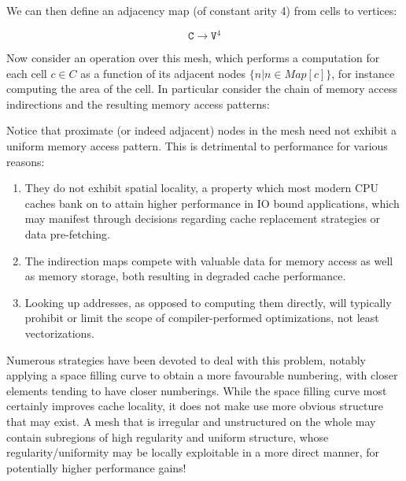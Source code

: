 We can then define an adjacency map (of constant arity 4) from cells to vertices:

$$\texttt{C} \rightarrow \texttt{V}^4$$

Now consider an operation over this mesh, which performs a computation for each cell $c \in C$ as a function of its adjacent nodes $\{n | n \in Map[c]\}$, for instance computing the area of the cell. In particular consider the chain of memory access indirections and the resulting memory access patterns:

%

Notice that proximate (or indeed adjacent) nodes in the mesh need not exhibit a uniform memory access pattern. This is detrimental to performance for various reasons:
\begin{enumerate}
\item They do not exhibit spatial locality, a property which most modern CPU caches bank on to attain higher performance in IO bound applications, which may manifest through decisions regarding cache replacement strategies or data pre-fetching.
\item The indirection maps compete with valuable data for memory access as well as memory storage, both resulting in degraded cache performance.
\item Looking up addresses, as opposed to computing them directly, will typically prohibit or limit the scope of compiler-performed optimizations, not least vectorizations.
\end{enumerate}

Numerous strategies have been devoted to deal with this problem, notably applying a space filling curve to obtain a more favourable numbering, with closer elements tending to have closer numberings. While the space filling curve most certainly improves cache locality, it does not make use more obvious structure that may exist. A mesh that is irregular and unstructured on the whole may contain subregions of high regularity and uniform structure, whose regularity/uniformity may be locally exploitable in a more direct manner, for potentially higher performance gains!


